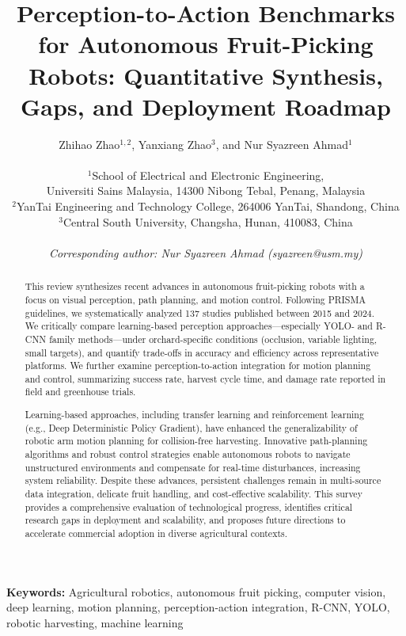 \documentclass[10pt,twocolumn]{article}
\title{Perception-to-Action Benchmarks for Autonomous Fruit-Picking Robots: Quantitative Synthesis, Gaps, and Deployment Roadmap}
\author{
  Zhihao Zhao$^{1,2}$, Yanxiang Zhao$^{3}$, and Nur Syazreen Ahmad$^{1}$ \\
  \\
  $^{1}$School of Electrical and Electronic Engineering, \\
  Universiti Sains Malaysia, 14300 Nibong Tebal, Penang, Malaysia \\
  $^{2}$YanTai Engineering and Technology College, 264006 YanTai, Shandong, China \\
  $^{3}$Central South University, Changsha, Hunan, 410083, China \\
  \\
  \textit{Corresponding author: Nur Syazreen Ahmad (syazreen@usm.my)}
}
\begin{document}
\maketitle

\begin{abstract}
This review synthesizes recent advances in autonomous fruit-picking robots with a focus on visual perception, path planning, and motion control. Following PRISMA guidelines, we systematically analyzed 137 studies published between 2015 and 2024. We critically compare learning-based perception approaches---especially YOLO- and R-CNN family methods---under orchard-specific conditions (occlusion, variable lighting, small targets), and quantify trade-offs in accuracy and efficiency across representative platforms. We further examine perception-to-action integration for motion planning and control, summarizing success rate, harvest cycle time, and damage rate reported in field and greenhouse trials. 

Learning-based approaches, including transfer learning and reinforcement learning (e.g., Deep Deterministic Policy Gradient), have enhanced the generalizability of robotic arm motion planning for collision-free harvesting. Innovative path-planning algorithms and robust control strategies enable autonomous robots to navigate unstructured environments and compensate for real-time disturbances, increasing system reliability. Despite these advances, persistent challenges remain in multi-source data integration, delicate fruit handling, and cost-effective scalability. This survey provides a comprehensive evaluation of technological progress, identifies critical research gaps in deployment and scalability, and proposes future directions to accelerate commercial adoption in diverse agricultural contexts.
\end{abstract}

\textbf{Keywords:} Agricultural robotics, autonomous fruit picking, computer vision, deep learning, motion planning, perception-action integration, R-CNN, YOLO, robotic harvesting, machine learning

\end{document}
